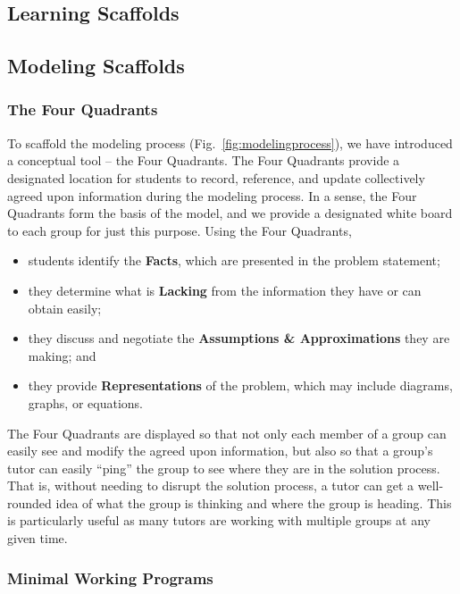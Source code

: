 \documentclass{msuphddissertation}
\begin{document}
\begin{doublespace}
%
%

\section{Learning Scaffolds}\label{sec:scaffolds}

\subsection{Modeling Scaffolds}

\subsubsection{The Four Quadrants}

To scaffold the modeling process (Fig.~\ref{fig:modelingprocess}), we have introduced a conceptual tool -- the Four Quadrants.  The Four Quadrants provide a designated location for students to record, reference, and update collectively agreed upon information during the modeling process.  In a sense, the Four Quadrants form the basis of the model, and we provide a designated white board to each group for just this purpose.  Using the Four Quadrants,
\begin{itemize}[noitemsep,nolistsep]
\item students identify the {\bf Facts}, which are presented in the problem statement;
\item they determine what is {\bf Lacking} from the information they have or can obtain easily;
\item they discuss and negotiate the {\bf Assumptions \& Approximations} they are making; and
\item they provide {\bf Representations} of the problem, which may include diagrams, graphs, or equations.
\end{itemize}

The Four Quadrants are displayed so that not only each member of a group can easily see and modify the agreed upon information, but also so that a group's tutor can easily ``ping'' the group to see where they are in the solution process.  That is, without needing to disrupt the solution process, a tutor can get a well-rounded idea of what the group is thinking and where the group is heading.  This is particularly useful as many tutors are working with multiple groups at any given time.

\subsubsection{Minimal Working Programs}


\end{doublespace}
\end{document}
